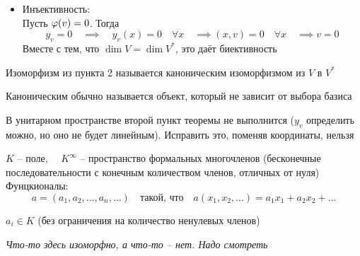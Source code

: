 \begin{theorem}
\begin{enumerate}
\begin{iproof}
\begin{itemize}
\begin{itemize}
				\end{itemize}
				\item Инъективность: \\
				Пусть $ \varphi(v) = 0 $. Тогда
				$$ y_v = 0 \quad \implies \quad y_v(x) = 0 \quad \forall x \quad \implies (x, v) = 0 \quad \forall x \quad \implies v = 0 $$
				Вместе с тем, что $ \dim V = \dim V^* $, это даёт биективность
			\end{itemize}
		\end{iproof}
	\end{enumerate}
\end{theorem}

\begin{definition}
	Изоморфизм из пункта 2 называется каноническим изоморфизмом из $ V $ в $ V^* $
\end{definition}

\begin{note}
	Каноническим обычно называется объект, который не зависит от выбора базиса
\end{note}

\begin{remark}
	В унитарном пространстве второй пункт теоремы не выполнится ($ y_v $ определить можно, но оно не будет линейным). Исправить это, поменяв координаты, нельзя
\end{remark}

\begin{eg}
	$ K $ -- поле, $ \quad K^\infty $ -- пространство формальных многочленов (бесконечные последовательности с конечным количеством членов, отличных от нуля) \\
	Фунцкионалы:
	$$ a = (a_1, a_2, ..., a_n, ...) \quad \text{такой, что} \quad a(x_1, x_2, ...) = a_1x_1 + a_2x_2 + ... $$
	\begin{remark}
		$ a_i \in K $ (без ограничения на количество ненулевых членов)
	\end{remark}
	\textit{Что-то здесь изоморфно, а что-то -- нет. Надо смотреть}
\end{eg}

